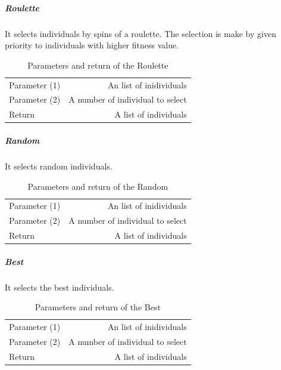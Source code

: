 \subparagraph{Roulette}
It selects individuals by spins of a roulette. The selection is make by given priority to individuals with higher fitness value.\\

\begin{table}[!h]
  \begin{center}
  \begin{tabular}{|l|r|}
    \hline
    Parameter (1) & An list of inidividuals\\
    Parameter (2) & A number of individual to select\\
    Return &  A list of individuals\\
    \hline    
  \end{tabular}
  \end{center}
  \caption{Parameters and return of the Roulette}
  \label{Roulette}
\end{table}

\subparagraph{Random}
It selects random individuals. \\

\begin{table}[!h]
  \begin{center}
  \begin{tabular}{|l|r|}
    \hline
    Parameter (1) & An list of inidividuals\\
    Parameter (2) & A number of individual to select\\
    Return &  A list of individuals\\
    \hline    
  \end{tabular}
  \end{center}
  \caption{Parameters and return of the Random}
  \label{Random}
\end{table}

\subparagraph{Best}
It selects the best individuals. \\

\begin{table}[!h]
  \begin{center}
  \begin{tabular}{|l|r|}
    \hline
    Parameter (1) & An list of inidividuals\\
    Parameter (2) & A number of individual to select\\
    Return &  A list of individuals\\
    \hline    
  \end{tabular}
  \end{center}
  \caption{Parameters and return of the Best}
  \label{Best}
\end{table}

